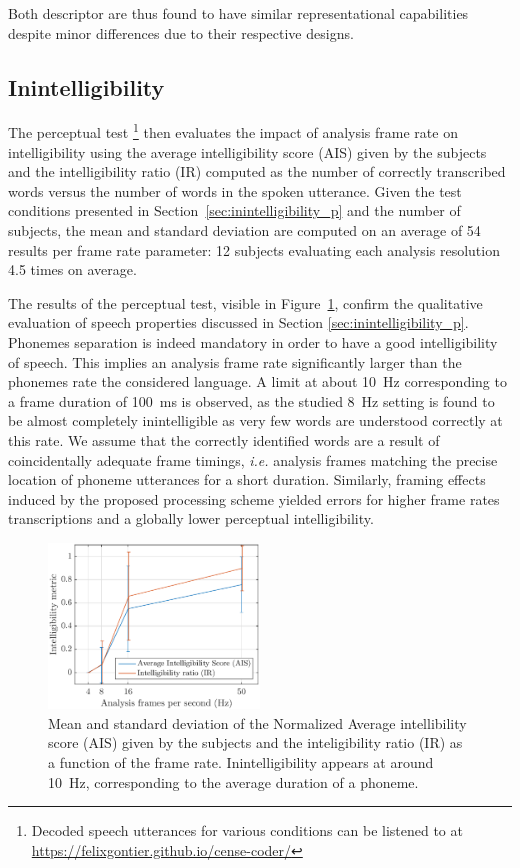 \documentclass[sensors,article,submit,moreauthors,pdftex,10pt,a4paper]{mdpi}
\begin{document}
Both descriptor are thus found to have similar representational capabilities despite minor differences due to their respective designs.


\subsection{Inintelligibility} \label{sec:inintelligibility_r}

The perceptual test \footnote{Decoded speech utterances for various conditions can be listened to at \url{https://felixgontier.github.io/cense-coder/}} then evaluates the impact of analysis frame rate on intelligibility using the average intelligibility score (AIS) given by the subjects and the intelligibility ratio (IR) computed as the number of correctly transcribed words versus the number of words in the spoken utterance. Given the test conditions presented in Section~\ref{sec:inintelligibility_p} and the number of subjects, the mean and standard deviation are computed on an average of 54 results per frame rate parameter: 12 subjects evaluating each analysis resolution 4.5 times on average.

The results of the perceptual test, visible in Figure~\ref{fig:subj_int}, confirm the qualitative evaluation of speech properties discussed in Section \ref{sec:inintelligibility_p}. Phonemes separation is indeed mandatory in order to have a good intelligibility of speech. This implies an analysis frame rate significantly larger than the phonemes rate the considered language. A limit at about 10~Hz corresponding to a frame duration of 100~ms is observed, as the studied 8~Hz setting is found to be almost completely inintelligible as very few words are understood correctly at this rate. We assume that the correctly identified words are a result of coincidentally adequate frame timings, \textit{i.e.} analysis frames matching the precise location of phoneme utterances for a short duration. Similarly, framing effects induced by the proposed processing scheme yielded errors for higher frame rates transcriptions and a globally lower perceptual intelligibility.\\

\begin{figure}[htbp]
	\centering
		\includegraphics[width=0.5\textwidth]{figures/subj_int.eps}
	\caption{Mean and standard deviation of the Normalized Average intellibility score (AIS) given by the subjects and the inteligibility ratio (IR) as a function of the frame rate. Inintelligibility appears at around 10~Hz, corresponding to the average duration of a phoneme.}
	\label{fig:subj_int}
\end{figure}
\end{document}
